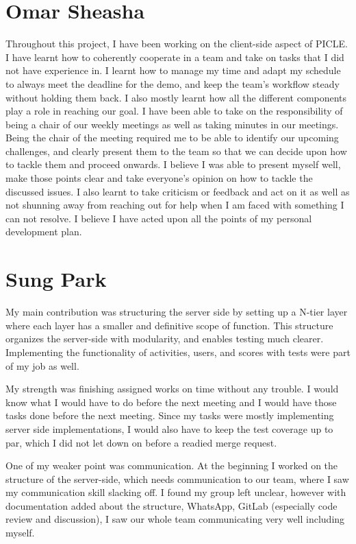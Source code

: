 \section{Omar Sheasha}
Throughout this project, I have been working on the client-side aspect of PICLE. 
I have learnt how to coherently cooperate in a team and take on tasks that I did not have experience in. I learnt how to manage my time and adapt my schedule to always meet the deadline for the demo, and keep the team’s workflow steady without holding them back. I also mostly learnt how all the different components play a role in reaching our goal.
I have been able to take on the responsibility of being a chair of our weekly meetings as well as taking minutes in our meetings. Being the chair of the meeting required me to be able to identify our upcoming challenges, and clearly present them to the team so that we can decide upon how to tackle them and proceed onwards. I believe I was able to present myself well, make those points clear and take everyone’s opinion on how to tackle the discussed issues.
I also learnt to take criticism or feedback and act on it as well as not shunning away from reaching out for help when I am faced with something I can not resolve.
I believe I have acted upon all the points of my personal development plan.

\section{Sung Park}
My main contribution was structuring the server side by setting up a N-tier layer where each layer has a smaller and definitive scope of function.
This structure organizes the server-side with modularity, and enables testing much clearer.
Implementing the functionality of activities, users, and scores with tests were part of my job as well.

My strength was finishing assigned works on time without any trouble.
I would know what I would have to do before the next meeting and I would have those tasks done before the next meeting.
Since my tasks were mostly implementing server side implementations, I would also have to keep the test coverage up to par, which I did not let down on before a readied merge request.

One of my weaker point was communication.
At the beginning I worked on the structure of the server-side, which needs communication to our team, where I saw my communication skill slacking off.
I found my group left unclear, however with documentation added about the structure, WhatsApp, GitLab (especially code review and discussion), I saw our whole team communicating very well including myself.

